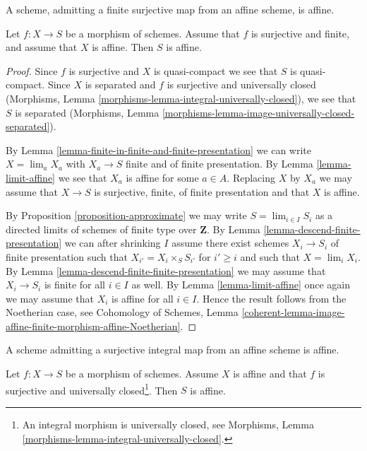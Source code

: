 \begin{lemma}
\label{lemma-affine}
\begin{slogan}
A scheme, admitting a finite surjective map from an affine scheme, is affine.
\end{slogan}
Let $f : X \to S$ be a morphism of schemes.
Assume that $f$ is surjective and finite, and assume that $X$ is affine.
Then $S$ is affine.
\end{lemma}

\begin{proof}
Since $f$ is surjective and $X$ is quasi-compact we see that $S$ is
quasi-compact. Since $X$ is separated and $f$ is surjective and
universally closed (Morphisms, Lemma
\ref{morphisms-lemma-integral-universally-closed}), we see that $S$
is separated (Morphisms, Lemma
\ref{morphisms-lemma-image-universally-closed-separated}).

\medskip\noindent
By Lemma \ref{lemma-finite-in-finite-and-finite-presentation}
we can write $X = \lim_a X_a$ with $X_a \to S$ finite and of finite
presentation. By Lemma \ref{lemma-limit-affine} we see that $X_a$
is affine for some $a \in A$. Replacing $X$ by $X_a$ we may assume
that $X \to S$ is surjective, finite, of finite presentation and
that $X$ is affine.

\medskip\noindent
By Proposition \ref{proposition-approximate} we may write
$S = \lim_{i \in I} S_i$ as
a directed limits of schemes of finite type over $\mathbf{Z}$.
By Lemma \ref{lemma-descend-finite-presentation} we can
after shrinking $I$ assume there exist schemes $X_i \to S_i$
of finite presentation such that $X_{i'} = X_i \times_S S_{i'}$
for $i' \geq i$ and such that $X = \lim_i X_i$. By
Lemma \ref{lemma-descend-finite-finite-presentation} we may
assume that $X_i \to S_i$ is finite for all $i \in I$ as well.
By Lemma \ref{lemma-limit-affine} once again we may assume that $X_i$ is
affine for all $i \in I$. Hence the result follows from the
Noetherian case, see Cohomology of Schemes,
Lemma \ref{coherent-lemma-image-affine-finite-morphism-affine-Noetherian}.
\end{proof}

\begin{proposition}
\label{proposition-affine}
\begin{slogan}
A scheme admitting a surjective integral map from an affine scheme is affine.
\end{slogan}
Let $f : X \to S$ be a morphism of schemes. Assume $X$ is affine
and that $f$ is surjective and universally closed\footnote{An integral
morphism is universally closed, see
Morphisms, Lemma \ref{morphisms-lemma-integral-universally-closed}.}.
Then $S$ is affine.
\end{proposition}

